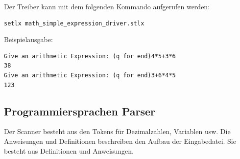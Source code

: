 Der Treiber kann mit dem folgenden Kommando aufgerufen werden:
\begin{Verbatim}
setlx math_simple_expression_driver.stlx
\end{Verbatim}
Beispielausgabe:
\begin{Verbatim}
Give an arithmetic Expression: (q for end)4*5+3*6
38
Give an arithmetic Expression: (q for end)3+6*4*5
123
\end{Verbatim}

\subsection{Programmiersprachen Parser}
Der Scanner  besteht aus den Tokens für Dezimalzahlen, Variablen usw.
Die Anweisungen und Definitionen  beschreiben den Aufbau der Eingabedatei. Sie besteht aus Definitionen und Anweisungen.


